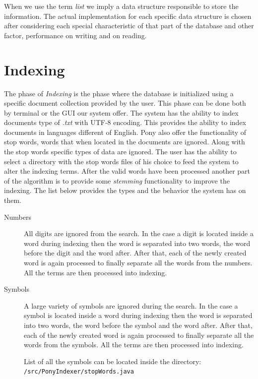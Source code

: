 \documentclass[letterpaper,twocolumn,10pt]{article}
\begin{document}
When we use the term \emph{ list} we imply a data structure responsible to store the information. The actual implementation for each specific data structure is chosen after considering each special characteristic of that part of the database and other factor, performance on writing and on reading.

\section{Indexing}
The phase of \emph{ Indexing} is the phase where the database is initialized using a specific document collection provided by the user. This phase can be done both by terminal or the GUI our system offer. The system has the ability to index documents type of {\it .txt} with UTF-8 encoding. This provides the ability to index documents in languages different of English. Pony also offer the functionality of stop words, words that when located in the documents are ignored. Along with the stop words specific types of data are ignored. The user has the ability to select a directory with the stop words files of his choice to feed the system to alter the indexing terms. After the valid words have been processed another part of the algorithm is to provide some \emph{ stemming} functionality to improve the indexing. The list below provides the types and the behavior the system has on them.

\begin{description}
  \item[Numbers] All digits are ignored from the search. In the case a digit is located inside a word during indexing then the word is separated into two words, the word before the digit and the word after. After that, each of the newly created word is again processed to finally separate all the words from the numbers. All the terms are then processed into indexing.
  \item[Symbols] A large variety of symbols are ignored during the search. In the case a symbol is located inside a word during indexing then the word is separated into two words, the word before the symbol and the word after. After that, each of the newly created word is again processed to finally separate all the words from the symbols. All the terms are then processed into indexing.

  List of all the symbols can be located inside the directory: {\tt /src/PonyIndexer/stopWords.java}
\end{description}
\end{document}
